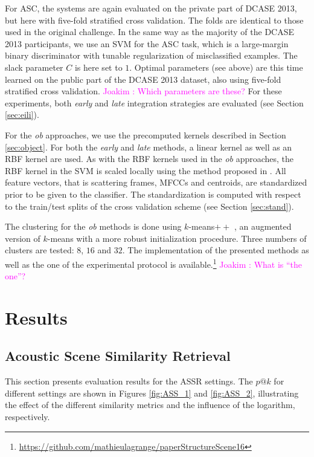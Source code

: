 \documentclass[journal]{IEEEtran}
\newcommand{\ja}[1]{\textcolor{magenta}{Joakim : #1}}
\begin{document}
For ASC, the systems are again evaluated on the private part of DCASE 2013, but here with five-fold stratified cross validation. The folds are identical to those used in the original challenge. In the same way as the majority of the DCASE 2013 participants, we use an SVM for the ASC task, which is a large-margin binary discriminator with tunable regularization of misclassified examples. The slack parameter $C$ is here set to $1$. Optimal parameters (see above) are this time learned on the public part of the DCASE 2013 dataset, also using five-fold stratified cross validation. \ja{Which parameters are these?} For these experiments, both \emph{early} and \emph{late} integration strategies are evaluated (see Section \ref{sec:eili}).

For the \emph{ob} approaches, we use the precomputed kernels described in Section \ref{sec:object}. For both the \emph{early} and \emph{late} methods, a linear kernel as well as an RBF kernel are used. As with the RBF kernels used in the \emph{ob} approaches, the RBF kernel in the SVM is scaled locally using the method proposed in \cite{selfTuneManor2004}. All feature vectors, that is scattering frames, MFCCs and centroids, are standardized prior to be given to the classifier. The standardization is computed with respect to the train/test splits of the cross validation scheme (see Section \ref{sec:stand}).

The clustering for the \emph{ob} methods is done using $k$-means$++$ \cite{arthur2007k}, an augmented version of $k$-means with a more robust initialization procedure. Three numbers of clusters are tested: $8$, $16$ and $32$. The implementation of the presented methods as well as the one of the experimental protocol is available.\footnote{\url{https://github.com/mathieulagrange/paperStructureScene16}} \ja{What is ``the one''?}

\section{Results \label{sec:results}}



\subsection{Acoustic Scene Similarity Retrieval}

This section presents evaluation results for the ASSR settings. The $p@k$ for different settings are shown in Figures \ref{fig:ASS_1} and \ref{fig:ASS_2}, illustrating the effect of the different similarity metrics and the influence of the logarithm, respectively.
\end{document}
